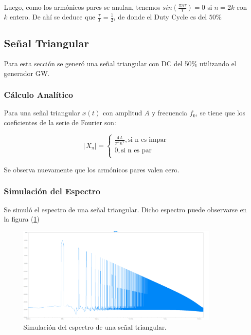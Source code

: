 Luego, como los armónicos pares se anulan, tenemos $sin(\frac{\pi n\tau}{T})=0$ si $n=2k$ con $k$ entero. De ahí se deduce que $\frac{\tau}{T}=\frac{1}{2}$, de donde el Duty Cycle es del $50\%$

\subsection{Señal Triangular}

Para esta sección se generó una señal triangular con DC del 50\% utilizando el generador GW.

\subsubsection{Cálculo Analítico}

Para una señal triangular $x(t)$ con amplitud $A$ y frecuencia $f_0$, se tiene que los coeficientes de la serie de Fourier son:

\begin{equation}
    |X_n|=
    \begin{cases}
                  \frac{4A}{\pi^2 n^2}, \text{si n es impar}\\ 
                  0, \text{si n es par} \\
     \end{cases}
\end{equation}

Se observa nuevamente que los armónicos pares valen cero. 

\subsubsection{Simulación del Espectro}

Se simuló el espectro de una señal triangular. Dicho espectro puede observarse en la figura (\ref{fig:simtriang})

\begin{figure}[H]
	\centering
	\includegraphics[width=0.9\textwidth]{ImagenesEjercicio2/FFT-Triangular.png}
\caption{Simulación del espectro de una señal triangular.}
	\label{fig:simtriang}
\end{figure}


